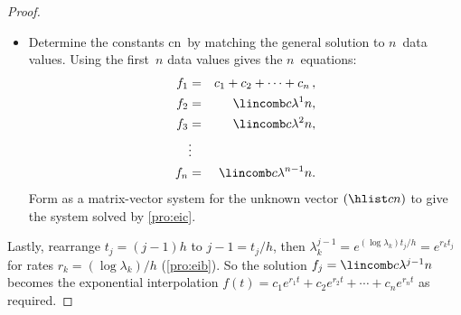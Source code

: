 \begin{proof}
\begin{itemize}
\item Determine the constants \hlist cn\ by matching the general solution to \(n\)~data values.
Using the first~\(n\) data values gives the \(n\)~equations:
\begin{eqnarray*}
f_1&=&c_1+c_2+\cdots+c_n\,,
\\f_2&=&\lincomb c{\lambda^{1}}n,
\\f_3&=&\lincomb c{\lambda^{2}}n,
\\&\vdots&
\\f_n&=&\lincomb c{\lambda^{n-1}}n.
\end{eqnarray*}
Form as a matrix-vector system for the unknown vector \((\hlist cn)\) to give the system solved by \autoref{pro:eic}.
\end{itemize}
Lastly, rearrange \(t_j=(j-1)h\) to \(j-1=t_j/h\), then \(\lambda_k^{j-1}=e^{(\log \lambda_k)t_j/h}=e^{r_kt_j}\) for rates \(r_k=(\log\lambda_k)/h\) (\autoref{pro:eib}).
So the solution \(f_j=\lincomb c{\lambda^{j-1}}n\) becomes the exponential interpolation \(f(t)=c_1e^{r_1t}+c_2e^{r_2t}+\cdots+c_ne^{r_nt}\) as required.
\end{proof}





